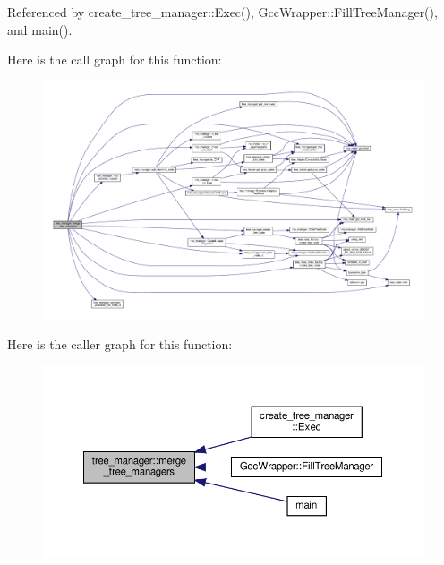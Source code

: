 Referenced by create\+\_\+tree\+\_\+manager\+::\+Exec(), Gcc\+Wrapper\+::\+Fill\+Tree\+Manager(), and main().

Here is the call graph for this function\+:
\nopagebreak
\begin{figure}[H]
\begin{center}
\leavevmode
\includegraphics[width=350pt]{d2/ddd/classtree__manager_aed8f92a1b3af6492bcf87a1ff63a93e1_cgraph}
\end{center}
\end{figure}
Here is the caller graph for this function\+:
\nopagebreak
\begin{figure}[H]
\begin{center}
\leavevmode
\includegraphics[width=350pt]{d2/ddd/classtree__manager_aed8f92a1b3af6492bcf87a1ff63a93e1_icgraph}
\end{center}
\end{figure}
\mbox{\label{classtree__manager_a92eb582d8b69951ef446f489c462df72}} 
